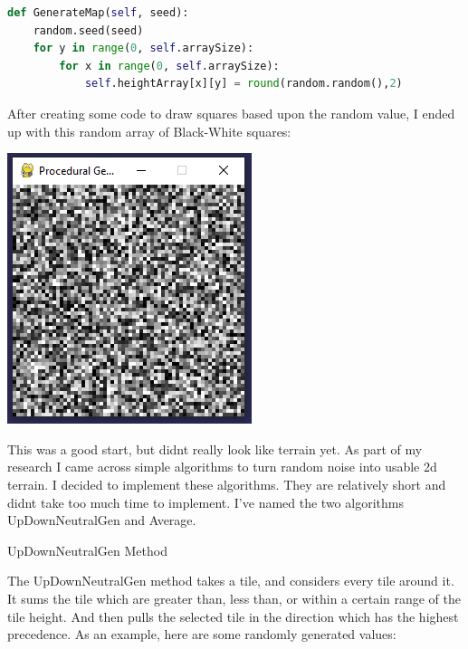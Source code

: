 \begin{flushleft}
\begin{enumerate}
            \normalsize\begin{lstlisting}[language=Python]
def GenerateMap(self, seed):
    random.seed(seed)
    for y in range(0, self.arraySize):
        for x in range(0, self.arraySize):
            self.heightArray[x][y] = round(random.random(),2)
            \end{lstlisting}

            \vspace{0.5cm}

            \large
            After creating some code to draw squares based upon the random value, I ended up with this 
            random array of Black-White squares:\\
            \vspace{0.5cm}
            \centerline{\includegraphics{Images/Prototype/RandomNoiseExample.PNG}}

            \vspace{0.5cm}

            This was a good start, but didnt really look like terrain yet. As part of my research I came 
            across simple algorithms to turn random noise into usable 2d terrain. I decided to implement
            these algorithms. They are relatively short and didnt take too much time to implement. I've
            named the two algorithms UpDownNeutralGen and Average.

            \vspace{1cm}

            {\large UpDownNeutralGen Method} \\
            \vspace{0.25cm}

            The UpDownNeutralGen method takes a tile, and considers every tile around it. It sums the tile 
            which are greater than, less than, or within a certain range of the tile height. And then pulls
            the selected tile in the direction which has the highest precedence. As an example, here are some
            randomly generated values:


\end{enumerate}
\end{flushleft}
